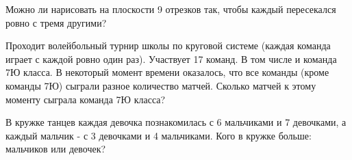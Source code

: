 \begin{thm}
    Можно ли нарисовать на плоскости 9 отрезков так, чтобы каждый пересекался ровно с тремя другими?
\end{thm}

\begin{thm}
    Проходит волейбольный турнир школы по круговой системе (каждая команда играет с каждой ровно один раз). Участвует 17 команд. В том числе и команда 7Ю класса. В некоторый момент времени оказалось, что все команды (кроме команды 7Ю) сыграли разное количество матчей. Сколько матчей к этому моменту сыграла команда 7Ю класса? 
\end{thm}

\begin{thm}
    В кружке танцев каждая девочка познакомилась с 6 мальчиками и 7 девочками, а каждый мальчик - с 3 девочками и 4 мальчиками. Кого в кружке больше: мальчиков или девочек?
\end{thm}

